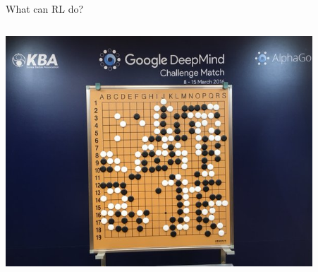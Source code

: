 \documentclass[9pt]{beamer}
\begin{document}
\begin{frame}{What can RL do?}
\begin{columns}
\begin{column}{0.33\textwidth}
\begin{center}
     \includegraphics[width=0.9\textwidth]{alphago}
     \end{center}
\end{column}
\begin{column}{0.67\textwidth}
\end{column}
\end{columns}
\end{frame}
\end{document}
